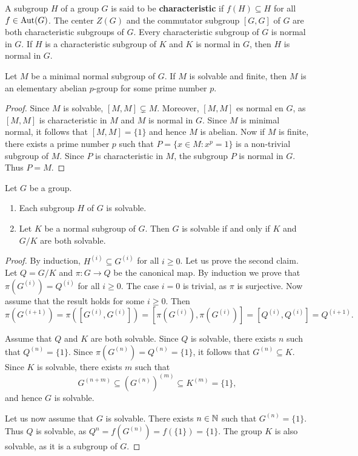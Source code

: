 A subgroup $H$ of a group $G$ is said to be \textbf{characteristic} if 
$f(H)\subseteq H$ for all $f\in\operatorname{Aut}(G)$. 
The center $Z(G)$ and the commutator subgroup $[G,G]$ of $G$ are both 
characteristic subgroups of $G$. Every characteristic subgroup of $G$ is normal in $G$. 
If $H$ is a characteristic subgroup of $K$ and $K$ is normal in $G$, 
then $H$ is normal in $G$. 

\begin{lemma}
	\label{lemma:minimal_normal}
	Let $M$ be a minimal normal subgroup of $G$. If $M$ is solvable and finite, then
	$M$ is an elementary abelian $p$-group for some prime number $p$. 
\end{lemma}

\begin{proof}
	Since $M$ is solvable, $[M,M]\subsetneq M$. Moreover, $[M,M]$ es normal en $G$, as 
    $[M,M]$ is characteristic in $M$ and $M$ is normal in $G$. Since $M$ is minimal normal, 
    it follows that $[M,M]=\{1\}$ and hence $M$ is abelian. 
	Now if $M$ is finite, there exists a prime number $p$ such that 
	$P=\{x\in M:x^p=1\}$ is a non-trivial subgroup of $M$.  
	Since $P$ is characteristic in $M$, the subgroup
	$P$ is normal in $G$. Thus $P=M$. 
\end{proof}

\begin{theorem}
	\label{theorem:resoluble}
	Let $G$ be a group. 
	\begin{enumerate}
		\item Each subgroup $H$ of $G$ is solvable. 
		\item Let $K$ be a normal subgroup of $G$. Then $G$ is solvable
			if and only if $K$ and $G/K$ are both solvable.
	\end{enumerate}
\end{theorem}

\begin{proof}
    By induction, $H^{(i)}\subseteq G^{(i)}$ for all 
    $i\geq0$. Let us prove the second claim. Let $Q=G/K$ and $\pi\colon G\to Q$ be the canonical map. 
    By induction we prove that $\pi(G^{(i)})=Q^{(i)}$ for all 
	$i\geq0$. The case $i=0$ is trivial, as $\pi$ is surjective. Now assume that
	the result holds for some $i\geq0$. Then 
	\[
		\pi(G^{(i+1)})=\pi([G^{(i)},G^{(i)}])=[\pi(G^{(i)}),\pi(G^{(i)})]=[Q^{(i)},Q^{(i)}]=Q^{(i+1)}.
	\]

	Assume that $Q$ and $K$ are both solvable. Since $Q$ is solvable, 
	there exists $n$ such that $Q^{(n)}=\{1\}$.
	Since $\pi(G^{(n)})=Q^{(n)}=\{1\}$, it follows that $G^{(n)}\subseteq K$. Since $K$
	is solvable, there exists $m$ such that 
	\[
		G^{(n+m)}\subseteq (G^{(n)})^{(m)}\subseteq K^{(m)}=\{1\},
	\]
	and hence $G$ is solvable.  

	Let us now assume that $G$ is solvable. There exists $n\in\mathbb{N}$ such that $G^{(n)}=\{1\}$.
	Thus $Q$ is solvable, as $Q^{n}=f(G^{(n)})=f(\{1\})=\{1\}$. The group $K$ is also 
	solvable, as it is a subgroup of $G$. 
\end{proof}

